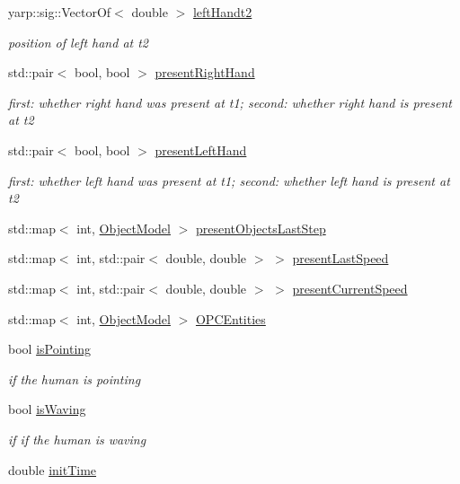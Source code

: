 \begin{DoxyCompactItemize}
yarp\+::sig\+::\+Vector\+Of$<$ double $>$ \hyperlink{group__pasar_a495a4143156903eabb2ab4450bf3007f}{left\+Handt2}
\begin{DoxyCompactList}\small\item\em position of left hand at t2 \end{DoxyCompactList}\item 
std\+::pair$<$ bool, bool $>$ \hyperlink{group__pasar_a5bdd7a086325ec7bc41f71579c922212}{present\+Right\+Hand}
\begin{DoxyCompactList}\small\item\em first\+: whether right hand was present at t1; second\+: whether right hand is present at t2 \end{DoxyCompactList}\item 
std\+::pair$<$ bool, bool $>$ \hyperlink{group__pasar_a30c0a497ae076d531d86361a8ba906fa}{present\+Left\+Hand}
\begin{DoxyCompactList}\small\item\em first\+: whether left hand was present at t1; second\+: whether left hand is present at t2 \end{DoxyCompactList}\item 
std\+::map$<$ int, \hyperlink{group__pasar_structObjectModel}{Object\+Model} $>$ \hyperlink{group__pasar_ab0c3a82aef0ace07c7c704c58ffc6394}{present\+Objects\+Last\+Step}
\item 
std\+::map$<$ int, std\+::pair$<$ double, double $>$ $>$ \hyperlink{group__pasar_a28ae26a5986426c363c29a43cc63a473}{present\+Last\+Speed}
\item 
std\+::map$<$ int, std\+::pair$<$ double, double $>$ $>$ \hyperlink{group__pasar_a704006bef0d56f1b7b0050d2e32b23cd}{present\+Current\+Speed}
\item 
std\+::map$<$ int, \hyperlink{group__pasar_structObjectModel}{Object\+Model} $>$ \hyperlink{group__pasar_a0d58b73edb50621d08296ec966ecba86}{O\+P\+C\+Entities}
\item 
bool \hyperlink{group__pasar_a76569b77bf2b4b9fa8782651660a9d2f}{is\+Pointing}
\begin{DoxyCompactList}\small\item\em if the human is pointing \end{DoxyCompactList}\item 
bool \hyperlink{group__pasar_af357a34636a7af813bd7cd980f3cafb2}{is\+Waving}
\begin{DoxyCompactList}\small\item\em if if the human is waving \end{DoxyCompactList}\item 
double \hyperlink{group__pasar_a35ffec49eb190ac39eab3ea3934b34f4}{init\+Time}
\end{DoxyCompactItemize}


